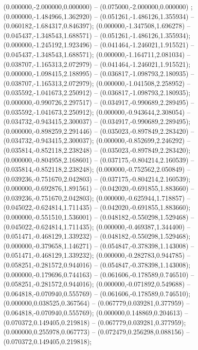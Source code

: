  (0.000000,-2.000000,0.000000) -- (0.075000,-2.000000,0.000000) ;
 (0.000000,-1.484966,1.362920) -- (0.051261,-1.486126,1.355934) -- (0.060182,-1.684317,0.846397);
 (0.000000,-1.347508,1.696278) -- (0.045437,-1.348543,1.688571) -- (0.051261,-1.486126,1.355934);
 (0.000000,-1.245192,1.923496) -- (0.041464,-1.246021,1.915521) -- (0.045437,-1.348543,1.688571);
 (0.000000,-1.164711,2.081034) -- (0.038707,-1.165313,2.072979) -- (0.041464,-1.246021,1.915521);
 (0.000000,-1.098415,2.188995) -- (0.036817,-1.098793,2.180935) -- (0.038707,-1.165313,2.072979);
 (0.000000,-1.041508,2.258952) -- (0.035592,-1.041673,2.250912) -- (0.036817,-1.098793,2.180935);
 (0.000000,-0.990726,2.297517) -- (0.034917,-0.990689,2.289495) -- (0.035592,-1.041673,2.250912);
 (0.000000,-0.943644,2.308054) -- (0.034732,-0.943415,2.300037) -- (0.034917,-0.990689,2.289495);
 (0.000000,-0.898259,2.291446) -- (0.035023,-0.897849,2.283420) -- (0.034732,-0.943415,2.300037);
 (0.000000,-0.852699,2.246292) -- (0.035814,-0.852118,2.238248) -- (0.035023,-0.897849,2.283420);
 (0.000000,-0.804958,2.168601) -- (0.037175,-0.804214,2.160539) -- (0.035814,-0.852118,2.238248);
 (0.000000,-0.752562,2.050849) -- (0.039236,-0.751670,2.042803) -- (0.037175,-0.804214,2.160539);
 (0.000000,-0.692876,1.891561) -- (0.042020,-0.691855,1.883660) -- (0.039236,-0.751670,2.042803);
 (0.000000,-0.625944,1.718857) -- (0.045022,-0.624814,1.711435) -- (0.042020,-0.691855,1.883660);
 (0.000000,-0.551510,1.536001) -- (0.048182,-0.550298,1.529468) -- (0.045022,-0.624814,1.711435);
 (0.000000,-0.469387,1.344400) -- (0.051471,-0.468129,1.339232) -- (0.048182,-0.550298,1.529468);
 (0.000000,-0.379658,1.146271) -- (0.054847,-0.378398,1.143008) -- (0.051471,-0.468129,1.339232);
 (0.000000,-0.282783,0.944785) -- (0.058251,-0.281572,0.944016) -- (0.054847,-0.378398,1.143008);
 (0.000000,-0.179696,0.744163) -- (0.061606,-0.178589,0.746510) -- (0.058251,-0.281572,0.944016);
 (0.000000,-0.071892,0.549688) -- (0.064818,-0.070940,0.555769) -- (0.061606,-0.178589,0.746510);
 (0.000000,0.038525,0.367564) -- (0.067779,0.039281,0.377959) -- (0.064818,-0.070940,0.555769);
 (0.000000,0.148869,0.204613) -- (0.070372,0.149405,0.219818) -- (0.067779,0.039281,0.377959);
 (0.000000,0.255978,0.067773) -- (0.072479,0.256298,0.088156) -- (0.070372,0.149405,0.219818);
